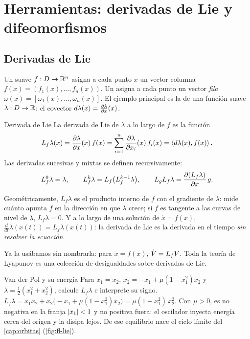 \section{Herramientas: derivadas de Lie y difeomorfismos}
\label{sec:fl-herramientas}

\subsection{Derivadas de Lie}

Un  suave $f:D\to\mathbb{R}^n$ asigna a cada punto $x$ un vector columna $f(x)=(f_1(x),\dots,f_n(x))$. Un  asigna a cada punto un vector \emph{fila} $\omega(x)=[\omega_1(x),\dots,\omega_n(x)]$. El ejemplo principal es la  de una función suave $\lambda:D\to\mathbb{R}$: el covector $d\lambda(x)=\frac{\partial \lambda}{\partial x}(x)$.

\begin{definicion}[label=def:fl-lie]{Derivada de Lie}
La derivada de Lie de $\lambda$ a lo largo de $f$ es la función
\begin{equation}
  L_f\lambda(x)=\frac{\partial \lambda}{\partial x}(x)\,f(x)=\sum_{i=1}^n\frac{\partial\lambda}{\partial x_i}(x)\,f_i(x)=\left\langle d\lambda(x),f(x)\right\rangle .
  \label{eq:fl-lie}
\end{equation}
Las derivadas sucesivas y mixtas se definen recursivamente:
\[
  L_f^0\lambda=\lambda,\qquad L_f^k\lambda=L_f\bigl(L_f^{k-1}\lambda\bigr),\qquad L_gL_f\lambda=\frac{\partial (L_f\lambda)}{\partial x}\,g .
\]
\end{definicion}

Geométricamente, $L_f\lambda$ es el producto interno de $f$ con el gradiente de $\lambda$: mide cuánto apunta $f$ en la dirección en que $\lambda$ crece; si $f$ es tangente a las curvas de nivel de $\lambda$, $L_f\lambda=0$. Y a lo largo de una solución de $\dot x=f(x)$, $\tfrac{d}{dt}\lambda(x(t))=L_f\lambda(x(t))$: la derivada de Lie es la derivada en el tiempo \emph{sin resolver la ecuación}.

\begin{ideaclave}
Ya la usábamos sin nombrarla: para $\dot x=f(x)$, $\dot V=L_fV$. Toda la teoría de Lyapunov es una colección de desigualdades sobre derivadas de Lie.
\end{ideaclave}

\begin{ejemplo}[label=ej:fl-lievdp]{Van der Pol y su energía}
Para $\dot x_1=x_2$, $\dot x_2=-x_1+\mu(1-x_1^2)x_2$ y $\lambda=\tfrac12(x_1^2+x_2^2)$, calcule $L_f\lambda$ e interprete su signo.
\solucion $L_f\lambda=x_1x_2+x_2\bigl(-x_1+\mu(1-x_1^2)x_2\bigr)=\mu(1-x_1^2)\,x_2^2$. Con $\mu>0$, es no negativa en la franja $\left\lvert x_1\right\rvert<1$ y no positiva fuera: el oscilador inyecta energía cerca del origen y la disipa lejos. De ese equilibrio nace el ciclo límite del \cref{cap:orbitas} (\cref{fig:fl-lie}).
\end{ejemplo}

